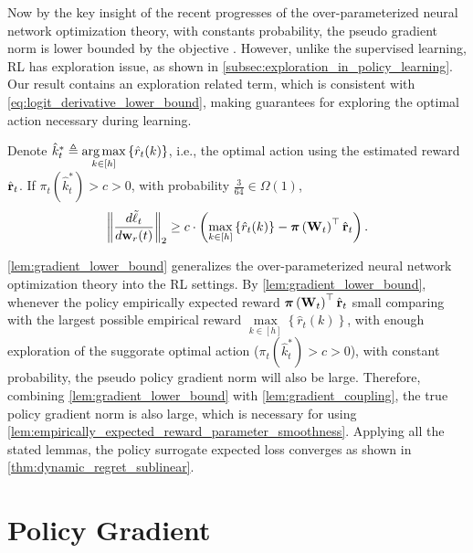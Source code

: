 Now by the key insight of the recent progresses of the over-parameterized neural network optimization theory, with constants probability, the pseudo gradient norm is lower bounded by the objective \citep{li2018learning}. However, unlike the supervised learning, RL has exploration issue, as shown in \cref{subsec:exploration_in_policy_learning}. Our result contains an exploration related term, which is consistent with \cref{eq:logit_derivative_lower_bound}, making guarantees for exploring the optimal action necessary during learning.

\begin{lem}
\label{lem:gradient_lower_bound}
	Denote $\hat{k}_t^* \triangleq \operatorname*{arg\,max}\limits_{k \in [h]}\left\{ \hat{r}_{t}(k) \right\}$, i.e., the optimal action using the estimated reward $ \hat{{\mathbf{r}}}_t$. If $\pi_{t}(\hat{k}_t^*) > c > 0$, with probability $\frac{3}{64} \in \Omega\left( 1 \right)$,
\begin{equation*}
\begin{split}
	\left\| \frac{d\tilde{\ell}_t}{d {\mathbf{w}}_r(t)} \right\|_2 \ge c \cdot \left( \max\limits_{k \in \left[h\right]}\left\{ \hat{r}_{t}(k) \right\} - {\boldsymbol{\pi}}\left( {\mathbf{W}}_t \right)^\top \hat{{\mathbf{r}}}_t \right) .
\end{split}
\end{equation*}
\end{lem}

\cref{lem:gradient_lower_bound} generalizes the over-parameterized neural network optimization theory into the RL settings. By \cref{lem:gradient_lower_bound}, whenever the policy empirically expected reward ${\boldsymbol{\pi}}\left( {\mathbf{W}}_t \right)^\top \hat{{\mathbf{r}}}_t$ small comparing with the largest possible empirical reward $\max\limits_{k \in \left[h\right]}\left\{ \hat{r}_{t}(k) \right\}$, with enough exploration of the suggorate optimal action ($\pi_{t}(\hat{k}_t^*) > c > 0$), with constant probability, the pseudo policy gradient norm will also be large. Therefore, combining \cref{lem:gradient_lower_bound} with \cref{lem:gradient_coupling}, the true policy gradient norm is also large, which is necessary for using \cref{lem:empirically_expected_reward_parameter_smoothness}. Applying all the stated lemmas, the policy surrogate expected loss converges as shown in \cref{thm:dynamic_regret_sublinear}.


\iffalse

\section{Policy Gradient}

